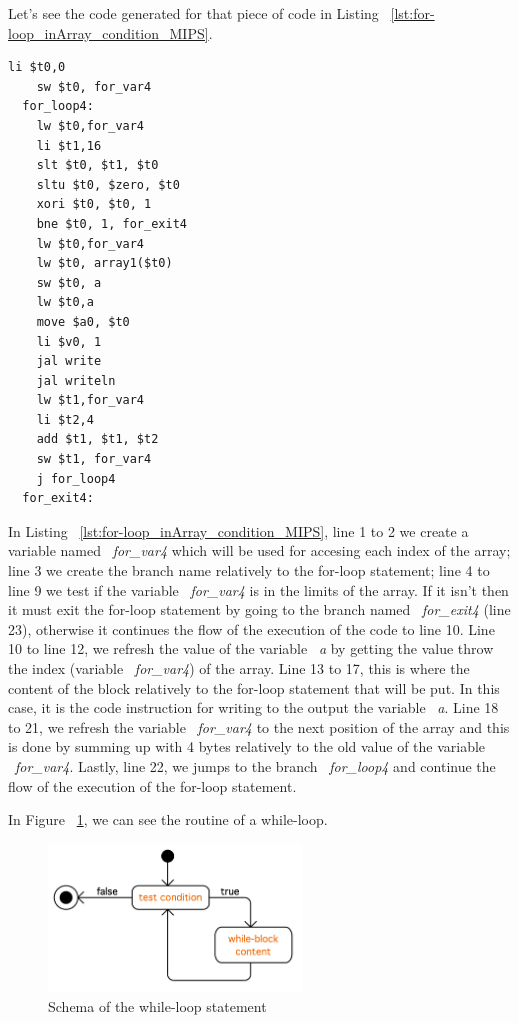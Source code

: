 \documentclass[
  oneside,
  11pt, a4paper,
  footinclude=true,
  headinclude=true,
  cleardoublepage=empty
]{scrbook}
\begin{document}
Let's see the code generated for that piece of code in Listing ~\ref{lst:for-loop_inArray_condition_MIPS}.

\begin{lstlisting}[caption={Code generated for the LISS code in Listing ~\ref{lst:for-loop_inArray_condition_LISS}},label={lst:for-loop_inArray_condition_MIPS}]
    li $t0,0		
    sw $t0, for_var4		
  for_loop4:
    lw $t0,for_var4		
    li $t1,16		
    slt $t0, $t1, $t0	
    sltu $t0, $zero, $t0	
    xori $t0, $t0, 1	
    bne $t0, 1, for_exit4		
    lw $t0,for_var4		
    lw $t0, array1($t0)		
    sw $t0, a		
    lw $t0,a		
    move $a0, $t0		
    li $v0, 1
    jal write		
    jal writeln		
    lw $t1,for_var4		
    li $t2,4		
    add $t1, $t1, $t2	
    sw $t1, for_var4		
    j for_loop4		
  for_exit4:
\end{lstlisting}

In Listing ~\ref{lst:for-loop_inArray_condition_MIPS}, line 1 to 2 we create a variable named ~\textit{for\_var4} which will be used for accesing each index of the array; line 3 we create the branch name relatively to the for-loop statement; line 4 to line 9 we test if the variable ~\textit{for\_var4} is in the limits of the array. If it isn't then it must exit the for-loop statement by going to the branch named ~\textit{for\_exit4} (line 23), otherwise it continues the flow of the execution of the code to line 10. Line 10 to line 12, we refresh the value of the variable ~\textit{a} by getting the value throw the index (variable ~\textit{for\_var4}) of the array. Line 13 to 17, this is where the content of the block relatively to the for-loop statement that will be put. In this case, it is the code instruction for writing to the output the variable ~\textit{a}. Line 18 to 21, we refresh the variable ~\textit{for\_var4} to the next position of the array and this is done by summing up with 4 bytes relatively to the old value of the variable ~\textit{for\_var4}. Lastly, line 22, we jumps to the branch ~\textit{for\_loop4} and continue the flow of the execution of the for-loop statement.

In Figure ~\ref{fig:for-loop_inArray}, we can see the routine of a while-loop.

\begin{figure}[h!]
  \centering
    \includegraphics[width=0.6\textwidth]{img/while-loop.png}
    \caption{Schema of the while-loop statement}
    \label{fig:for-loop_inArray}
\end{figure}
\end{document}

